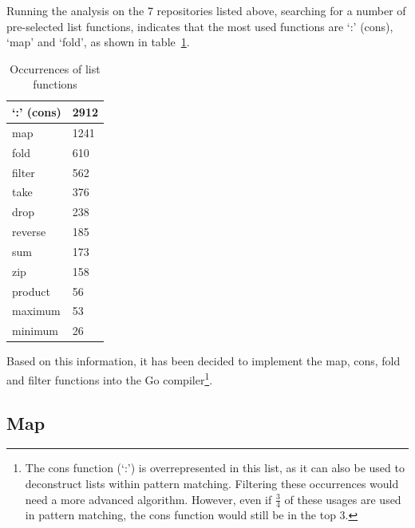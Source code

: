 Running the analysis on the 7 repositories listed above, searching for a number
of pre-selected list functions, indicates that the most used functions are `:'
(cons), `map' and `fold', as shown in table~\ref{tab:occurrences-list-funcs}.

\begin{table}[htb]
\centering
\begin{tabular}{ll}
\toprule
`:' (cons) & 2912 \\
\midrule
map & 1241 \\
\midrule
fold & 610 \\
\midrule
filter & 562 \\
\midrule
take & 376 \\
\midrule
drop & 238 \\
\midrule
reverse & 185 \\
\midrule
sum & 173 \\
\midrule
zip & 158 \\
\midrule
product & 56 \\
\midrule
maximum & 53 \\
\midrule
minimum & 26 \\
\end{tabular}
\caption[Occurrences of list functions]{Occurrences of list functions\footnotemark}
\label{tab:occurrences-list-funcs}
\end{table}


Based on this information, it has been decided to implement the map, cons, fold
and filter functions into the Go compiler\footnote{The cons function (`:') is overrepresented in this list,
    as it can also be used to deconstruct lists within pattern matching. Filtering
    these occurrences would need a more advanced algorithm. However, even if $\tfrac{3}{4}$
    of these usages are used in pattern matching, the cons function would still be
    in the top 3.
}.

\subsection{Map}

